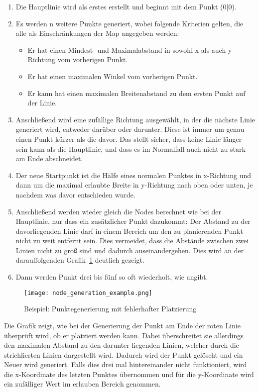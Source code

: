 \begin{enumerate}
    \item Die Hauptlinie wird als erstes erstellt und beginnt mit dem Punkt (0|0).
    \item Es werden n weitere Punkte generiert, wobei folgende Kriterien gelten, die alle als Einschränkungen der Map angegeben werden:
    \begin{itemize}
        \item Er hat einen Mindest- und Maximalabstand in sowohl x als auch y Richtung vom vorherigen Punkt.
        \item Er hat einen maximalen Winkel vom vorherigen Punkt.
        \item Er kann hat einen maximalen Breitenabstand zu dem ersten Punkt auf der Linie.
    \end{itemize}
    \item Anschließend wird eine zufällige Richtung ausgewählt, in der die nächste Linie generiert wird, entweder darüber oder darunter.
    Diese ist immer um genau einen Punkt kürzer als die davor.
    Das stellt sicher, dass keine Linie länger sein kann als die Hauptlinie, und dass es im Normalfall auch nicht zu stark am Ende abschneidet.
    \item Der neue Startpunkt ist die Hälfe eines normalen Punktes in x-Richtung und dann um die maximal erlaubte Breite in y-Richtung nach oben oder unten, je nachdem was davor entschieden wurde.
    \item Anschließend werden wieder gleich die Nodes berechnet wie bei der Hauptlinie, nur dass ein zusätzlicher Punkt dazukommt:
    Der Abstand zu der davorliegenden Linie darf in einem Bereich um den zu planierenden Punkt nicht zu weit entfernt sein.
    Dies vermeidet, dass die Abstände zwischen zwei Linien nicht zu groß sind und dadurch auseinandergehen.
    Dies wird an der darauffolgenden Grafik~\ref{fig:point-generation} deutlich gezeigt.
    \item Dann werden Punkt drei bis fünf so oft wiederholt, wie  angibt.
\end{enumerate}

\begin{figure}[H]
    \centering
    \texttt{[image: node\_generation\_example.png]}
    \caption{Beispiel: Punktegenerierung mit fehlerhafter Platzierung}\label{fig:point-generation}
\end{figure}
Die Grafik zeigt, wie bei der Generierung der Punkt am Ende der roten Linie überprüft wird, ob er platziert werden kann.
Dabei überschreitet sie allerdings den maximalen Abstand zu den darunter liegenden Linien, welcher durch die strichlierten Linien dargestellt wird.
Dadurch wird der Punkt gelöscht und ein Neuer wird generiert.
Falls dies drei mal hintereinander nicht funktioniert, wird die x-Koordinate des letzten Punktes übernommen und für die y-Koordinate wird ein zufälliger Wert im erlauben Bereich genommen.


